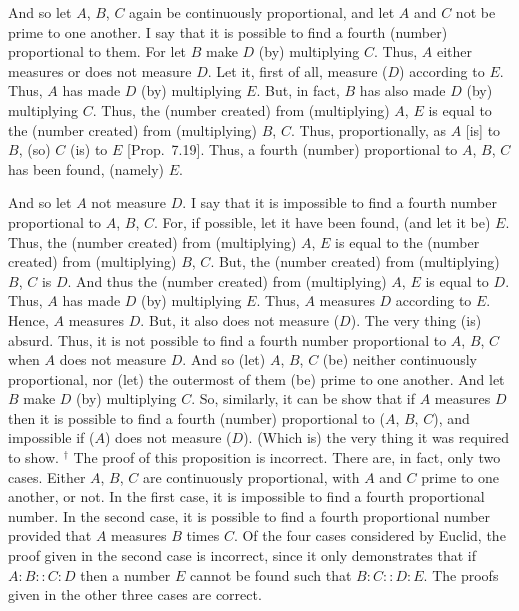 And so let $A$, $B$, $C$  again be continuously proportional, and let $A$ and $C$ not be prime to one another. I say that it is possible to find
a fourth (number) proportional to them. For let $B$ make $D$ (by) multiplying $C$. Thus, $A$ either measures or does not measure $D$. 
Let it, first of all, measure ($D$) according to $E$. Thus, $A$ has made $D$ (by) multiplying $E$. But, in fact, $B$ has also made $D$ (by) multiplying $C$. Thus, the (number created) from (multiplying) $A$, $E$
is equal to the (number created) from (multiplying) $B$, $C$. Thus, 
proportionally, as $A$ [is] to $B$, (so) $C$ (is) to $E$ [Prop.~7.19]. Thus, a fourth (number) proportional
to $A$, $B$, $C$ has been found, (namely) $E$.

And so let $A$ not measure $D$. I say that it is impossible to find a fourth
number proportional to $A$, $B$, $C$. For, if possible, let it have
been found, (and let it be) $E$. Thus, the (number created) from
(multiplying) $A$, $E$ is equal to the (number created) from (multiplying)
$B$, $C$. But, the (number created) from (multiplying) $B$, $C$ is $D$.
And thus the (number created) from (multiplying) $A$, $E$ is equal to $D$.
Thus, $A$ has made $D$ (by) multiplying $E$. Thus, $A$ measures
$D$ according to $E$. Hence, $A$ measures $D$. But, it also does not
measure ($D$). The very thing (is) absurd. Thus, it is not possible
to find a fourth number proportional to $A$, $B$, $C$ when $A$ does not
measure $D$. And so (let) $A$, $B$, $C$ (be) neither continuously
proportional, nor (let) the outermost of them (be) prime to one another.
And let $B$ make $D$ (by) multiplying $C$. So, similarly, it can be show that
if $A$ measures $D$ then it is possible to find a fourth (number)
proportional to ($A$, $B$, $C$), and impossible if ($A$) does not measure ($D$).
(Which is) the very thing it was required to show.
{\footnotesize\noindent$^\dag$ The proof of this proposition is incorrect.
There are, in fact, only two cases. Either $A$, $B$, $C$ are continuously
proportional,  with $A$ and $C$ prime to one another, or not. In the first case, 
it is impossible to find a fourth proportional number. In the second case,
it is possible to find a fourth proportional number provided that $A$
measures $B$ times $C$. Of the four cases considered by Euclid,
the proof given in the second case is incorrect, since it only demonstrates that
if $A:B::C:D$ then a number $E$ cannot be found such that $B:C::D:E$. The proofs given in the other three cases are correct.}


